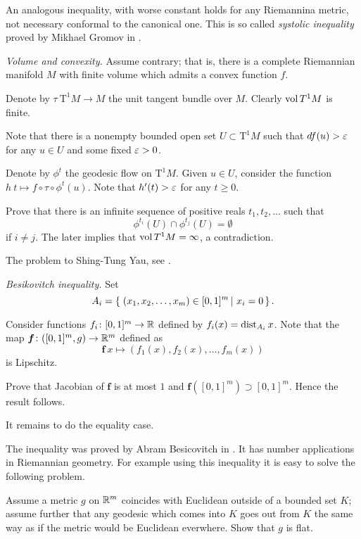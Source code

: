 An analogous inequality,
with worse constant holds for any Riemannina metric, 
not necessary conformal to the canonical one.
This is so called \emph{systolic inequality} proved by Mikhael Gromov in \cite{gromov-filling}.

\textit{Volume and convexity.}
Assume contrary; that is, there is a complete Riemannian manifold $M$
with finite volume which admits a convex function $f$.

Denote by $\tau\:\mathrm{T}^1 M\to M$ the unit tangent bundle over $M$. 
Clearly $\operatorname{\rm vol} T^1M$ is finite.

Note that 
there is a nonempty bounded open set $U\subset \mathrm{T}^1 M$
such that $df(u)>\varepsilon$ for any $u\in U$ and some fixed $\varepsilon>0$.

Denote by $\phi^t$ the geodesic flow on $\mathrm{T}^1 M$.
Given $u\in U$,
consider the function $h\:t\mapsto f\circ\tau\circ\phi^t(u)$.
Note that $h'(t)>\varepsilon$ for any $t\ge 0$.

Prove that there is an infinite sequence of positive reals $t_1,t_2,\dots$
such that 
$$\phi^{t_i}(U)\cap\phi^{t_j}(U)=\emptyset$$ 
if $i\ne j$.
The later implies that $\operatorname{\rm vol} T^1M=\infty$,
a contradiction.

 The problem to Shing-Tung Yau, see \cite{yau}.

\textit{Besikovitch inequality.}
Set 
\[A_i=\set{(x_1,x_2,\dots,x_m)\in[0,1]^m}{x_i=0}.\]

Consider functions $f_i\colon[0,1]^m\to\mathbb{R}$ defined by
$f_i(x)=\operatorname{\rm dist}_{A_i}x$.
Note that 
the map $\bm{f}\colon([0,1]^m,g)\to\mathbb{R}^m$
defined as
\[\bm{f}\:x\mapsto(f_1(x),f_2(x),\dots,f_m(x))\]
is Lipschitz.

Prove that Jacobian of  $\bm{f}$
is at most $1$
and $\bm{f}([0,1]^m)\supset [0,1]^m$.
Hence the result follows.

It remains to do the equality case.

The inequality was proved by Abram Besicovitch in \cite{besicovitch}.
It has number applications in Riemannian geometry.
For example using this inequality it is easy to solve the following problem.

Assume a metric $g$ on $\mathbb{R}^m$ coincides with Euclidean outside of a bounded set $K$;
assume further that any geodesic which comes into $K$ goes out from $K$ the same way as if the metric would be Euclidean everwhere. 
Show that $g$ is flat.


